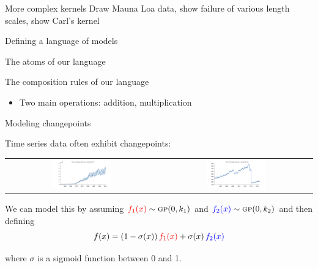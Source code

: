 \begin{frame}{More complex kernels}
  Draw Mauna Loa data, show failure of various length scales, show Carl's kernel
\end{frame}

\begin{frame}{Defining a language of models}
  
\end{frame}

\begin{frame}{The atoms of our language}  
  
\end{frame}

\begin{frame}{The composition rules of our language}
\begin{itemize} 
	\item Two main operations: addition, multiplication
\end{itemize}

\end{frame}

\begin{frame}{Modeling changepoints}
  
  Time series data often exhibit changepoints:
  
  \begin{center}
  \begin{tabular}{cc}
    \includegraphics[width=0.4\textwidth]{figures/09-gas-production_7_cum} &
    \includegraphics[width=0.4\textwidth]{figures/07-call-centre_6_cum} 
  \end{tabular}
  \end{center}
  
  \pause

  We can model this by assuming $\textcolor{red}{f_1(x)} \sim {\textsc{gp}}{}(0,k_1)$ and $\textcolor{blue}{f_2(x)} \sim {\textsc{gp}}{}(0,k_2)$ and then defining
\[
f(x) = (1-\sigma(x))\, \textcolor{red}{f_1(x)} + \sigma(x)\, \textcolor{blue}{f_2(x)}
\]

where $\sigma$ is a sigmoid function between 0 and 1.
\end{frame}

